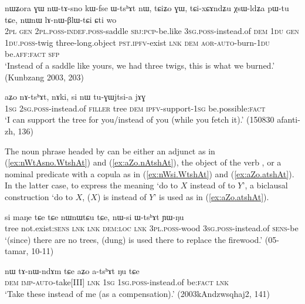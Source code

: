 \begin{exe}
\ex \label{ex:nWtAsno.WtshAt}
\gll nɯʑora ɣɯ nɯ-tɤ-sno kɯ-fse ɯ-tsʰɤt nɯ, tɕiʑo ɣɯ, tɕi-xɕɤndʑu χsɯ-ldʑa pɯ-tu tɕe, nɯnɯ lɤ-nɯ-βlɯ-tɕi ɕti wo \\
\textsc{2pl} \textsc{gen} \textsc{2pl}.\textsc{poss}-\textsc{indef}.\textsc{poss}-saddle \textsc{sbj}:\textsc{pcp}-be.like \textsc{3sg}.\textsc{poss}-instead.of \textsc{dem} \textsc{1du} \textsc{gen} \textsc{1du}.\textsc{poss}-twig three-long.object \textsc{pst}.\textsc{ipfv}-exist \textsc{lnk} \textsc{dem} \textsc{aor}-\textsc{auto}-burn-\textsc{1du} be.\textsc{aff}:\textsc{fact} \textsc{sfp} \\
\glt `Instead of a saddle like yours, we had three twigs, this is what we burned.' (Kunbzang 2003, 203)
\end{exe}

\begin{exe}
\ex \label{ex:aZo.nAtshAt}
\gll aʑo nɤ-tsʰɤt, nɤki, si nɯ tu-ɣɯjtsi-a jɤɣ \\
\textsc{1sg} \textsc{2sg}.\textsc{poss}-instead.of \textsc{filler} tree \textsc{dem} \textsc{ipfv}-support-\textsc{1sg} be.possible:\textsc{fact} \\
\glt `I can support the tree for you/instead of you (while you fetch it).' (150830 afanti-zh, 136)
\end{exe}

 The noun phrase headed by  can be either an adjunct as in (\ref{ex:nWtAsno.WtshAt}) and (\ref{ex:aZo.nAtshAt}), the object of the verb , or a nominal predicate with a copula as in (\ref{ex:nWsi.WtshAt}) and (\ref{ex:aZo.atshAt}).  In the latter case, to express the meaning `do to $X$ instead of to $Y$', a biclausal construction `do to $X$, ($X$) is instead of $Y$' is used as in (\ref{ex:aZo.atshAt}).

\begin{exe}
\ex \label{ex:nWsi.WtshAt}
\gll si maŋe tɕe tɕe nɯnɯtɕu tɕe, nɯ-si ɯ-tsʰɤt ɲɯ-ŋu  \\
tree not.exist:\textsc{sens} \textsc{lnk} \textsc{lnk} \textsc{dem}:\textsc{loc} \textsc{lnk} \textsc{3pl}.\textsc{poss}-wood \textsc{3sg}.\textsc{poss}-instead.of \textsc{sens}-be \\
\glt `(since) there are no trees, (dung) is used there to replace the firewood.' (05-tamar, 10-11)
\end{exe}


\begin{exe}
\ex \label{ex:aZo.atshAt}
\gll nɯ tɤ-nɯ-ndɤm tɕe aʑo a-tsʰɤt ŋu tɕe \\
\textsc{dem} \textsc{imp}-\textsc{auto}-take[III] \textsc{lnk} \textsc{1sg} \textsc{1sg}.\textsc{poss}-instead.of be:\textsc{fact} \textsc{lnk} \\
\glt `Take these instead of me (as a compensation).' (2003kAndzwsqhaj2, 141)
\end{exe}


